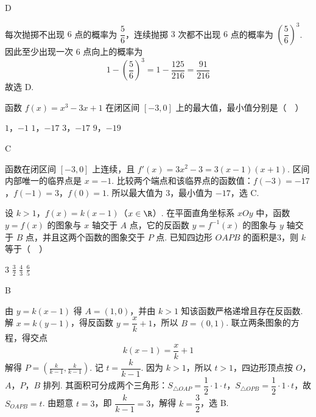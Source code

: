 \begin{answer}
D
\end{answer}

\begin{solution}
每次抛掷不出现 \(6\) 点的概率为 \(\dfrac56\)，连续抛掷 \(3\) 次都不出现 \(6\) 点的概率为 \(\left(\dfrac56\right)^3\). 因此至少出现一次 \(6\) 点向上的概率为
\[
1-\left(\frac56\right)^3=1-\frac{125}{216}=\frac{91}{216}
\]
故选 D.
\end{solution}

\begin{problem}
函数 \( f(x) = x^3 - 3x + 1 \) 在闭区间 \([-3, 0]\) 上的最大值，最小值分别是（\(\quad\)）

\choices
    {\(1\)，\(-1\)}
    {\(1\)，\(-17\)}
    {\(3\)，\(-17\)}
    {\(9\)，\(-19\)}
\end{problem}

\begin{answer}
C
\end{answer}

\begin{solution}
函数在闭区间 \([-3,0]\) 上连续，且 \(f'(x)=3x^2-3=3(x-1)(x+1)\). 区间内部唯一的临界点是 \(x=-1\). 比较两个端点和该临界点的函数值：\(f(-3)=-17\)，\(f(-1)=3\)，\(f(0)=1\). 所以最大值为 \(3\)，最小值为 \(-17\)，选 C.
\end{solution}

\begin{problem}
设 \(k > 1\)，\(f(x) = k(x - 1)\)（\(x \in \R\)）. 在平面直角坐标系 \(xOy\) 中，函数 \(y = f(x)\) 的图象与 \(x\) 轴交于 \(A\) 点，它的反函数 \(y = f^{-1}(x)\) 的图象与 \(y\) 轴交于 \(B\) 点，并且这两个函数的图象交于 \(P\) 点. 已知四边形 \(OAPB\) 的面积是\(3\)，则 \(k\) 等于（\(\quad\)）

\choices
    {\(3\)}
    {\(\frac{3}{2}\)}
    {\( \frac{4}{3} \)}
    {\(\frac{6}{5}\)}
\end{problem}

\begin{answer}
B
\end{answer}

\begin{solution}
由 \(y=k(x-1)\) 得 \(A=(1,0)\)，并由 \(k>1\) 知该函数严格递增且存在反函数. 解 \(x=k(y-1)\)，得反函数 \(y=\dfrac{x}{k}+1\)，所以 \(B=(0,1)\). 联立两条图象的方程，得交点
\[
k(x-1)=\frac{x}{k}+1
\]
解得 \(P=\left(\frac{k}{k-1},\frac{k}{k-1}\right)\).
记 \(t=\dfrac{k}{k-1}\). 因为 \(k>1\)，所以 \(t>1\)，四边形顶点按 \(O\)，\(A\)，\(P\)，\(B\) 排列. 其面积可分成两个三角形：\(S_{\triangle OAP}=\dfrac12\cdot1\cdot t\)，\(S_{\triangle OPB}=\dfrac12\cdot1\cdot t\)，故 \(S_{OAPB}=t\). 由题意 \(t=3\)，即 \(\dfrac{k}{k-1}=3\)，解得 \(k=\dfrac32\)，选 B.
\end{solution}

